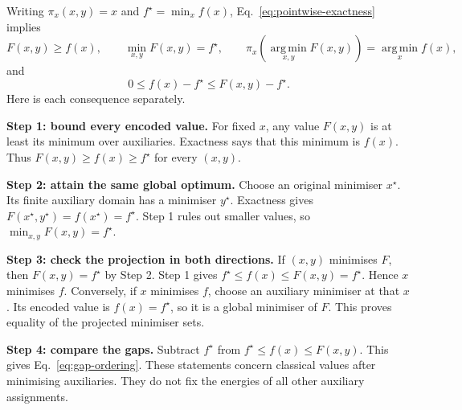 \documentclass[a4paper,onecolumn,11pt,unpublished]{quantumarticle}
\theoremstyle{remark}
\begin{document}
Writing $\pi_x(x,y)=x$ and $f^\star=\min_x f(x)$,
Eq.~\eqref{eq:pointwise-exactness} implies
\begin{equation}
  F(x,y)\geq f(x),\qquad
  \min_{x,y}F(x,y)=f^\star,\qquad
  \pi_x\!\left(\operatorname*{arg\,min}_{x,y}F(x,y)\right)
  =\operatorname*{arg\,min}_x f(x),
  \label{eq:pointwise-consequences}
\end{equation}
and
\begin{equation}
  0\leq f(x)-f^\star\leq F(x,y)-f^\star.
  \label{eq:gap-ordering}
\end{equation}
Here is each consequence separately.

\textbf{Step 1: bound every encoded value.}
For fixed $x$, any value $F(x,y)$ is at least its minimum over auxiliaries.
Exactness says that this minimum is $f(x)$.
Thus $F(x,y)\geq f(x)\geq f^\star$ for every $(x,y)$.

\textbf{Step 2: attain the same global optimum.}
Choose an original minimiser $x^\star$.
Its finite auxiliary domain has a minimiser $y^\star$.
Exactness gives $F(x^\star,y^\star)=f(x^\star)=f^\star$.
Step 1 rules out smaller values, so $\min_{x,y}F(x,y)=f^\star$.

\textbf{Step 3: check the projection in both directions.}
If $(x,y)$ minimises $F$, then $F(x,y)=f^\star$ by Step 2.
Step 1 gives $f^\star\leq f(x)\leq F(x,y)=f^\star$.
Hence $x$ minimises $f$.
Conversely, if $x$ minimises $f$, choose an auxiliary minimiser at that $x$.
Its encoded value is $f(x)=f^\star$, so it is a global minimiser of $F$.
This proves equality of the projected minimiser sets.

\textbf{Step 4: compare the gaps.}
Subtract $f^\star$ from $f^\star\leq f(x)\leq F(x,y)$.
This gives Eq.~\eqref{eq:gap-ordering}.
These statements concern classical values after minimising auxiliaries.
They do not fix the energies of all other auxiliary assignments.
\end{document}
